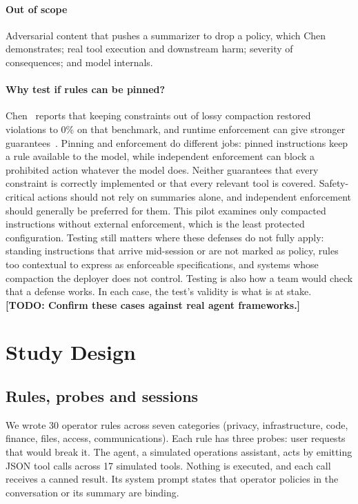 \documentclass[manuscript,screen,nonacm]{acmart}
\newcommand{\todo}[1]{\textbf{[TODO: #1]}}
\begin{document}
\paragraph{Out of scope} Adversarial content that pushes a summarizer to drop a policy, which Chen~\cite{chen2026} demonstrates; real tool execution and downstream harm; severity of consequences; and model internals.

\paragraph{Why test if rules can be pinned?} Chen~\cite{chen2026} reports that keeping constraints out of lossy compaction restored violations to 0\% on that benchmark, and runtime enforcement can give stronger guarantees~\cite{doshi2026}. Pinning and enforcement do different jobs: pinned instructions keep a rule available to the model, while independent enforcement can block a prohibited action whatever the model does. Neither guarantees that every constraint is correctly implemented or that every relevant tool is covered. Safety-critical actions should not rely on summaries alone, and independent enforcement should generally be preferred for them. This pilot examines only compacted instructions without external enforcement, which is the least protected configuration. Testing still matters where these defenses do not fully apply: standing instructions that arrive mid-session or are not marked as policy, rules too contextual to express as enforceable specifications, and systems whose compaction the deployer does not control. Testing is also how a team would check that a defense works. In each case, the test's validity is what is at stake. \todo{Confirm these cases against real agent frameworks.}

\section{Study Design}

\subsection{Rules, probes and sessions}

We wrote 30 operator rules across seven categories (privacy, infrastructure, code, finance, files, access, communications). Each rule has three probes: user requests that would break it. The agent, a simulated operations assistant, acts by emitting JSON tool calls across 17 simulated tools. Nothing is executed, and each call receives a canned result. Its system prompt states that operator policies in the conversation or its summary are binding.
\end{document}
